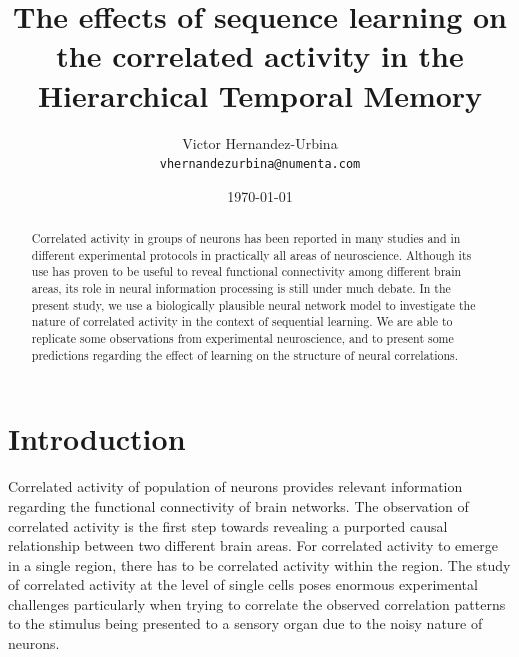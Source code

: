 \documentclass[11pt,letterpaper]{article}
\begin{document}
    \title{The effects of sequence learning on the correlated activity in the Hierarchical Temporal Memory}
	\author{Victor Hernandez-Urbina\\
	    \texttt{vhernandezurbina@numenta.com}
	}
    \date{\today}
    
    \maketitle
    
    \begin{abstract}
        Correlated activity in groups of neurons has been reported
        in many studies and in different experimental protocols in practically all
        areas of neuroscience. Although its use has proven to be useful to reveal
        functional connectivity among different brain areas,
        its role in neural information processing is still under much debate.
        In the present study, we use a biologically plausible neural network model to
        investigate the nature of correlated activity in the context of 
        sequential learning.
        We are able to replicate some observations from experimental
        neuroscience, and to present some predictions regarding the effect
        of learning on the structure of neural correlations.
    \end{abstract}
    
    
    \section{Introduction}
        Correlated activity of population of neurons provides relevant information
        regarding the functional connectivity of brain networks.
        The observation of correlated activity is the first step towards revealing 
        a purported causal relationship between two different brain areas.
        For correlated activity to emerge in a single region, there has to be
        correlated activity within the region.
        The study of correlated activity at the level of single cells poses enormous
        experimental challenges particularly when trying to correlate the observed
        correlation patterns to the stimulus being presented to a sensory organ due to
        the noisy nature of neurons.
        
\end{document}
